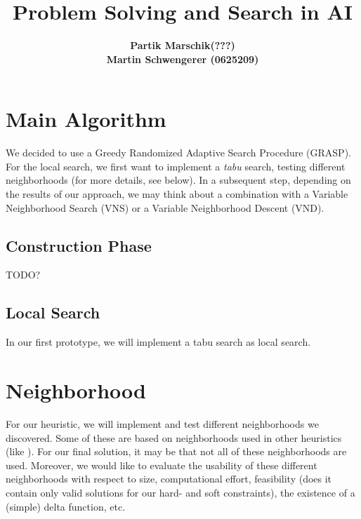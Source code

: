 \documentclass[a4paper,11pt]{article}
\title{ \LARGE \bf Problem Solving and Search in AI }
\author{
\bf Partik Marschik(???) \\
\bf Martin Schwengerer (0625209) }
\begin{document}
\maketitle

\section{Main Algorithm}
We decided to use a Greedy Randomized Adaptive Search Procedure (GRASP). For the local search, we first want to implement a \emph{tabu} search, testing different neighborhoods (for more details, see below). In a subsequent step, depending on the results of our approach, we may think about a combination with a Variable Neighborhood Search (VNS) or a Variable Neighborhood Descent (VND).



\subsection{Construction Phase}
TODO?
\subsection{Local Search}
In our first prototype, we will implement a tabu search as local search.

\section{Neighborhood}
For our heuristic, we will implement and test different neighborhoods we discovered. Some of these are based on neighborhoods used in other heuristics (like \cite{Gaspero07,rvk2008}).
For our final solution, it may be that not all of these neighborhoods are used. Moreover, we would like to evaluate the usability of these different neighborhoods with respect to size, computational effort, feasibility (does it contain only valid solutions for our hard- and soft constraints), the existence of a (simple) delta function, etc.
\end{document}

